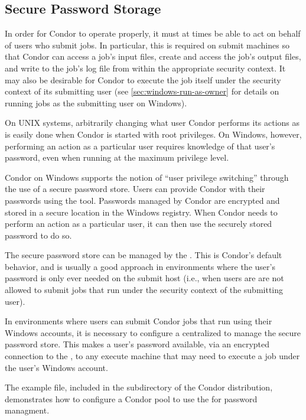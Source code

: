\subsection{\label{sec:windows-sps}Secure Password Storage}

In order for Condor to operate properly, it must at times be able to
act on behalf of users who submit jobs.  In particular, this is
required on submit machines so that Condor can access a job's input
files, create and access the job's output files, and write to the
job's log file from within the appropriate security context.  It may
also be desirable for Condor to execute the job itself under the
security context of its submitting user (see
\ref{sec:windows-run-as-owner} for details on running jobs as the
submitting user on Windows).

On UNIX systems, arbitrarily changing what user Condor performs its
actions as is easily done when Condor is started with root privileges.
On Windows, however, performing an action as a particular user
requires knowledge of that user's password, even when running at the
maximum privilege level.

Condor on Windows supports the notion of ``user privilege switching''
through the use of a secure password store.  Users can provide Condor
with their passwords using the  tool.  Passwords
managed by Condor are encrypted and stored in a secure location in the
Windows registry.  When Condor needs to perform an action as a
particular user, it can then use the securely stored password to do
so.

The secure password store can be managed by the .  This
is Condor's default behavior, and is usually a good approach in
environments where the user's password is only ever needed on the
submit host (i.e., when users are are not allowed to
submit jobs that run under the security context of the submitting
user).

In environments where users can submit Condor jobs that run using
their Windows accounts, it is necessary to configure a centralized
 to manage the secure password store.  This makes a
user's password available, via an encrypted connection to the
, to any execute machine that may need to execute a job
under the user's Windows account.

The  example file, included in the
 subdirectory of the Condor distribution, demonstrates how
to configure a Condor pool to use the  for password
managment.

